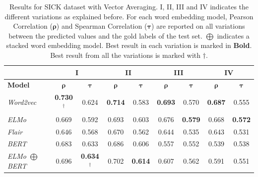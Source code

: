 \begin{enumerate}
\begin{table}[htb]
{\begin{tabular}{|l|cc|cc|cc|cc|}
			\hline & 
			\multicolumn{2}{c|}{\textbf{I}}    & \multicolumn{2}{c|}{\textbf{II}}   & \multicolumn{2}{c|}{\textbf{III}}  &    
			\multicolumn{2}{c|}{\textbf{IV}}   \\ 
			\hline
			\multicolumn{1}{|l|}{\textbf{Model}} 
			& $\bm{\rho}$   & $\bm{\tau}$     
			& $\bm{\rho}$   & $\bm{\tau}$  
			& $\bm{\rho}$   & $\bm{\tau}$  
			& $\bm{\rho}$   & $\bm{\tau}$  
			\\ \hline
			\textit{Word2vec}                  
			& \textbf{0.730}$^{\dagger}$  & 0.624        
			& \textbf{0.714}        & 0.583    
			& \textbf{0.693}        & 0.570    
			& \textbf{0.687}        & 0.555    \\
			\textit{ELMo}                     
			& 0.669                 & 0.592         
			& 0.693                 & 0.603       
			& 0.676                 & \textbf{0.579}  
			& 0.668                 & \textbf{0.572}      \\
			\textit{Flair}                     
			& 0.646                 & 0.568         
			& 0.670                 & 0.562       
			& 0.644                 & 0.535  
			& 0.643                 & 0.531      \\
			\textit{BERT}                     
			& 0.683                 & 0.633         
			& 0.686                 & 0.606       
			& 0.557                 & 0.552  
			& 0.539                 & 0.538 \\
			\textit{ELMo $\bigoplus$ BERT}                     
			& 0.696                 & \textbf{0.634}$^{\dagger}$          
			& 0.702                 & \textbf{0.614}       
			& 0.607                 & 0.562  
			& 0.591                 & 0.551 \\
			\hline
		\end{tabular}
	}
	\caption[Results for SICK with Vector Averaging]{Results for SICK dataset with Vector Averaging. I, II, III and IV indicates the different variations as explained before. For each word embedding model, Pearson Correlation ($\bm{\rho}$) and Spearman Correlation ($\bm{\tau}$) are reported on all variations between the predicted values and the gold labels of the test set. $\bigoplus$ indicates a stacked word embedding model. Best result in each variation is marked in \textbf{Bold}. Best result from all the variations is marked with ${\dagger}$. }  
	\label{tab:sick_average_vectors}
\end{table}

\begin{table}[htb]
	\centering
\end{table}
\end{enumerate}
